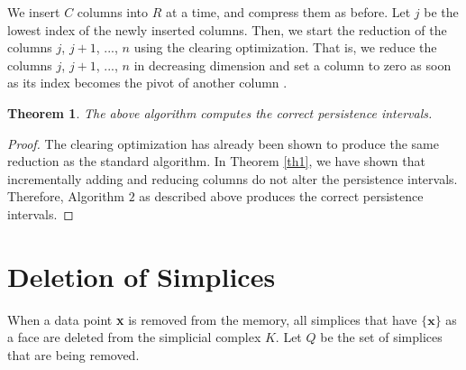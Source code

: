 \documentclass[11pt]{article}
\newtheorem{theorem}{Theorem}[section]
\begin{document}
We insert $C$ columns into $R$ at a time, and compress them as before.  Let $j$ be the lowest index 
of the newly inserted columns.  Then, we start the reduction of the columns $j$, $j + 1$, ..., $n$ 
using the clearing optimization.  That is, we reduce the columns $j$, $j + 1$, ..., $n$ in 
decreasing dimension and set a column to zero as soon as its index becomes the pivot of another 
column \cite{chen-11}.


\begin{theorem}
	The above algorithm computes the correct persistence intervals.
\end{theorem}


\begin{proof}
	
	The clearing optimization has already been shown to produce the same reduction as the standard
	algorithm.  In Theorem \ref{th1}, we have shown that incrementally adding and reducing columns  
	do not alter the persistence intervals.  Therefore, Algorithm $2$ as described above produces 
	the correct persistence intervals.
	
\end{proof}




\section{Deletion of Simplices}

When a data point \textbf{x} is removed from the memory, all simplices that have $\{\textbf{x}\}$ 
as a face are deleted from the simplicial complex $K$. Let $Q$ be the set of simplices that are 
being removed.








\end{document}
